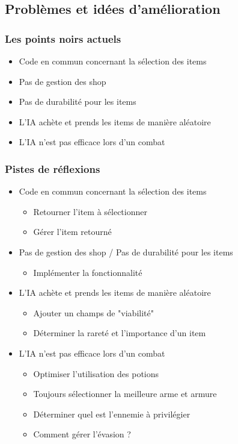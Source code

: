 \documentclass[beamer]{BetterDocument}
\begin{document}
	\subsection{Problèmes et idées d'amélioration}
	\begin{frame}
		\frametitle{Les points noirs actuels}

		\begin{itemize}
			\item{Code en commun concernant la sélection des items}
			\item{Pas de gestion des shop}
			\item{Pas de durabilité pour les items}
			\item{L'IA achète et prends les items de manière aléatoire}
			\item{L'IA n'est pas efficace lors d'un combat}
		\end{itemize}
	\end{frame}

	\begin{frame}
		\frametitle{Pistes de réflexions}

		\begin{itemize}
			\item{Code en commun concernant la sélection des items}
			\begin{itemize}
				\item{Retourner l'item à sélectionner}
				\item{Gérer l'item retourné}
			\end{itemize}

			\item{Pas de gestion des shop / Pas de durabilité pour les items}
			\begin{itemize}
				\item{Implémenter la fonctionnalité}
			\end{itemize}

			\item{L'IA achète et prends les items de manière aléatoire}
			\begin{itemize}
				\item{Ajouter un champs de "viabilité"}
				\item{Déterminer la rareté et l'importance d'un item}
			\end{itemize}

			\item{L'IA n'est pas efficace lors d'un combat}
			\begin{itemize}
				\item{Optimiser l'utilisation des potions}
				\item{Toujours sélectionner la meilleure arme et armure}
				\item{Déterminer quel est l'ennemie à privilégier}
				\item{Comment gérer l'évasion ?}
			\end{itemize}
		\end{itemize}
	\end{frame}
\end{document}
